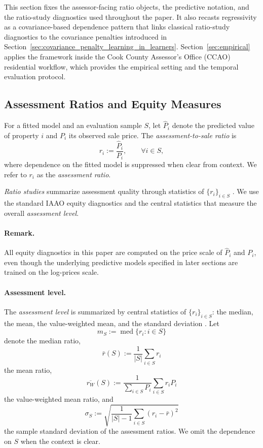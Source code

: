 \documentclass[12pt]{article}
\theoremstyle{plain}
\theoremstyle{definition}
\newcommand{\1}{\mathbf{1}}
\begin{document}
This section fixes the assessor-facing ratio objects, the predictive notation, and the ratio-study diagnostics used throughout the paper. It also recasts regressivity as a covariance-based dependence pattern that links classical ratio-study diagnostics to the covariance penalties introduced in Section~\ref{sec:covariance_penalty_learning_in_learners}. Section~\ref{sec:empirical} applies the framework inside the Cook County Assessor's Office (CCAO) residential workflow, which provides the empirical setting and the temporal evaluation protocol.

\subsection{Assessment Ratios and Equity Measures}
\label{subsec:equity_metrics}

For a fitted model and an evaluation sample $S$, let $\widehat P_i$ denote the predicted value of property $i$ and $P_i$ its observed sale price. The \emph{assessment-to-sale ratio} is
\begin{equation}
\label{eq:ratio_def}
r_i := \frac{\widehat P_i}{P_i},
\qquad \forall i\in S,
\end{equation}
where dependence on the fitted model is suppressed when clear from context. We refer to $r_i$ as the \emph{assessment ratio}.

\emph{Ratio studies} summarize assessment quality through statistics of $\{r_i\}_{i\in S}$ \cite{IAAO2025ExposureRatio}. We use the standard IAAO equity diagnostics and the central statistics that measure the overall \emph{assessment level}.

\paragraph{Remark.} All equity diagnostics in this paper are computed on the price scale of $\widehat P_i$ and $P_i$, even though the underlying predictive models specified in later sections are trained on the log-prices scale.

\paragraph{Assessment level.}
The \emph{assessment level} is summarized by central statistics of $\{r_i\}_{i\in S}$: the median, the mean, the value-weighted mean, and the standard deviation \cite{IAAO2025ExposureRatio}. Let
\[
m_S := \operatorname{med}\{r_i: i\in S\}
\]
denote the median ratio,
\[
\bar r (S) := \frac{1}{|S|}\sum_{i\in S} r_i
\]
the mean ratio,
\[
\overline{r_W} (S) := \frac{1}{\sum_{i\in S} P_i}\sum_{i\in S} r_i P_i
\]
the value-weighted mean ratio, and
\[
\sigma_S := \sqrt{\frac{1}{|S|-1}\sum_{i\in S}(r_i-\bar r)^2}
\]
the sample standard deviation of the assessment ratios. We omit the dependence on $S$ when the context is clear.
\end{document}
